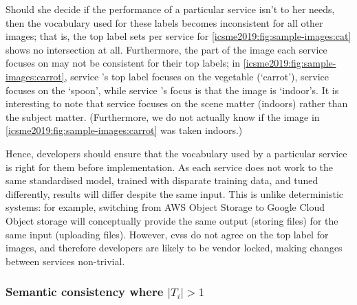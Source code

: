 Should she decide if the performance of a particular service isn't to her needs, then the vocabulary used for these labels becomes inconsistent for all other images; that is, the top label sets per service for \cref{icsme2019:fig:sample-images:cat} shows no intersection at all. Furthermore, the part of the image each service focuses on may not be consistent for their top labels; in \cref{icsme2019:fig:sample-images:carrot}, service \googleapi{}'s top label focuses on the vegetable (`carrot'), service \awsapi{} focuses on the `spoon', while service \azureapi{}'s focus is that the image is `indoor's. It is interesting to note that service \azureapi{} focuses on the scene matter (indoors) rather than the subject matter. (Furthermore, we do not actually know if the image in \cref{icsme2019:fig:sample-images:carrot} was taken indoors.)

Hence, developers should ensure that the vocabulary used by a particular service is right for them before implementation. As each service does not work to the same standardised model, trained with disparate training data, and tuned differently, results will differ despite the same input. This is unlike deterministic systems: for example, switching from AWS Object Storage to Google Cloud Object storage will conceptually provide the same output (storing files) for the same input (uploading files). However, \glspl{cvs} do not agree on the top label for images, and therefore developers are likely to be vendor locked, making changes between services non-trivial.

\subsubsection{Semantic consistency where $|T_{i}| > 1$}

